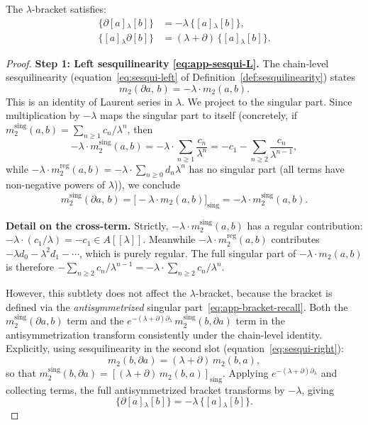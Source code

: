\begin{proposition}[Sesquilinearity]
\label{prop:app-sesqui}
The $\lambda$-bracket satisfies:
\begin{align}
\label{eq:app-sesqui-L}
\{\partial [a]{}_\lambda [b]\} &= -\lambda\,\{[a]{}_\lambda [b]\},\\[4pt]
\label{eq:app-sesqui-R}
\{[a]{}_\lambda \partial [b]\} &= (\lambda + \partial)\,\{[a]{}_\lambda [b]\}.
\end{align}
\end{proposition}

\begin{proof}
\textbf{Step 1: Left sesquilinearity \eqref{eq:app-sesqui-L}.}
The chain-level sesquilinearity (equation~\eqref{eq:sesqui-left} of Definition~\ref{def:sesquilinearity}) states
\[
m_2(\partial a,\, b) = -\lambda \cdot m_2(a,b).
\]
This is an identity of Laurent series in $\lambda$. We project to the singular part. Since multiplication by $-\lambda$ maps the singular part to itself (concretely, if $m_2^{\mathrm{sing}}(a,b) = \sum_{n\ge 1} c_n/\lambda^n$, then
\[
-\lambda \cdot m_2^{\mathrm{sing}}(a,b) = -\lambda \cdot \sum_{n\ge 1}\frac{c_n}{\lambda^n} = -c_1 - \sum_{n\ge 2}\frac{c_n}{\lambda^{n-1}},
\]
while $-\lambda \cdot m_2^{\mathrm{reg}}(a,b) = -\lambda \cdot \sum_{n\ge 0} d_n \lambda^n$ has no singular part (all terms have non-negative powers of $\lambda$)), we conclude
\[
m_2^{\mathrm{sing}}(\partial a,\, b) = \bigl[-\lambda \cdot m_2(a,b)\bigr]_{\mathrm{sing}} = -\lambda \cdot m_2^{\mathrm{sing}}(a,b).
\]

\noindent\textbf{Detail on the cross-term.} Strictly, $-\lambda \cdot m_2^{\mathrm{sing}}(a,b)$ has a regular contribution: $-\lambda \cdot (c_1/\lambda) = -c_1 \in A[[\lambda]]$. Meanwhile $-\lambda \cdot m_2^{\mathrm{reg}}(a,b)$ contributes $-\lambda d_0 - \lambda^2 d_1 - \cdots$, which is purely regular. The full singular part of $-\lambda \cdot m_2(a,b)$ is therefore $-\sum_{n\ge 2} c_n/\lambda^{n-1} = -\lambda \cdot \sum_{n\ge 2} c_n/\lambda^n$.

However, this subtlety does not affect the $\lambda$-bracket, because the bracket is defined via the \emph{antisymmetrized} singular part~\eqref{eq:app-bracket-recall}. Both the $m_2^{\mathrm{sing}}(\partial a, b)$ term and the $e^{-(\lambda+\partial)\partial_\lambda}\,m_2^{\mathrm{sing}}(b,\partial a)$ term in the antisymmetrization transform consistently under the chain-level identity. Explicitly, using sesquilinearity in the second slot (equation~\eqref{eq:sesqui-right}):
\[
m_2(b,\partial a) = (\lambda + \partial)\,m_2(b,a),
\]
so that $m_2^{\mathrm{sing}}(b,\partial a) = [(\lambda+\partial)\,m_2(b,a)]_{\mathrm{sing}}$. Applying $e^{-(\lambda+\partial)\partial_\lambda}$ and collecting terms, the full antisymmetrized bracket transforms by $-\lambda$, giving
\[
\{\partial [a]{}_\lambda [b]\} = -\lambda\,\{[a]{}_\lambda [b]\}.
\]


\end{proof}

